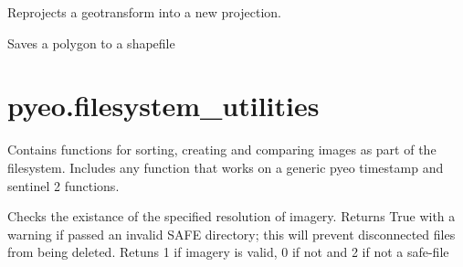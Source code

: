 \documentclass[letterpaper,10pt,english]{sphinxmanual}
\begin{document}

\begin{fulllineitems}
\label{\detokenize{index:pyeo.coordinate_manipulation.reproject_geotransform}}
Reprojects a geotransform into a new projection.

\end{fulllineitems}


\begin{fulllineitems}
\label{\detokenize{index:pyeo.coordinate_manipulation.write_geometry}}
Saves a polygon to a shapefile

\end{fulllineitems}

\label{\detokenize{index:module-pyeo.filesystem_utilities}}

\section{pyeo.filesystem\_utilities}
\label{\detokenize{index:pyeo-filesystem-utilities}}
Contains functions for sorting, creating and comparing images as part of the filesystem. Includes any function
that works on a generic pyeo timestamp and sentinel 2 functions.

\begin{fulllineitems}
\label{\detokenize{index:pyeo.filesystem_utilities.check_for_invalid_l1_data}}
Checks the existance of the specified resolution of imagery. Returns True with a warning if passed
an invalid SAFE directory; this will prevent disconnected files from being deleted.
Retuns 1 if imagery is valid, 0 if not and 2 if not a safe-file

\end{fulllineitems}
\end{document}
